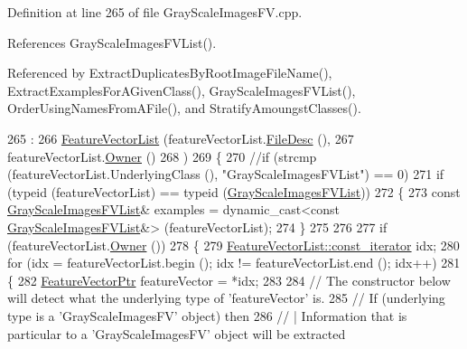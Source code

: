 Definition at line 265 of file Gray\+Scale\+Images\+F\+V.\+cpp.



References Gray\+Scale\+Images\+F\+V\+List().



Referenced by Extract\+Duplicates\+By\+Root\+Image\+File\+Name(), Extract\+Examples\+For\+A\+Given\+Class(), Gray\+Scale\+Images\+F\+V\+List(), Order\+Using\+Names\+From\+A\+File(), and Stratify\+Amoungst\+Classes().


\begin{DoxyCode}
265                                                                                         :
266   \hyperlink{class_k_k_m_l_l_1_1_feature_vector_list_a102284896708eb82b5879dcf9a92e974}{FeatureVectorList} (featureVectorList.\hyperlink{class_k_k_m_l_l_1_1_feature_vector_list_a736923be9c4ac7553a5aa87dd24efd16}{FileDesc} (),
267                      featureVectorList.\hyperlink{class_k_k_b_1_1_k_k_queue_a4990d037ff09dd504cc7df53819bf61a}{Owner} ()
268                     )
269 \{
270   \textcolor{comment}{//if  (strcmp (featureVectorList.UnderlyingClass (), "GrayScaleImagesFVList") == 0)}
271   \textcolor{keywordflow}{if}  (\textcolor{keyword}{typeid} (featureVectorList) == \textcolor{keyword}{typeid} (\hyperlink{class_k_k_m_l_l_1_1_gray_scale_images_f_v_list_aabed2fbe6de7f052cc63dc941a863372}{GrayScaleImagesFVList}))
272   \{
273     \textcolor{keyword}{const} \hyperlink{class_k_k_m_l_l_1_1_gray_scale_images_f_v_list}{GrayScaleImagesFVList}&  examples = \textcolor{keyword}{dynamic\_cast<}\textcolor{keyword}{const }
      \hyperlink{class_k_k_m_l_l_1_1_gray_scale_images_f_v_list}{GrayScaleImagesFVList}&\textcolor{keyword}{>} (featureVectorList);
274   \}
275 
276 
277   \textcolor{keywordflow}{if}  (featureVectorList.\hyperlink{class_k_k_b_1_1_k_k_queue_a4990d037ff09dd504cc7df53819bf61a}{Owner} ())
278   \{
279     \hyperlink{class_k_k_b_1_1_k_k_queue_aeb057c9c010446f46f57c1e355f981f1}{FeatureVectorList::const\_iterator}  idx;
280     \textcolor{keywordflow}{for}  (idx = featureVectorList.begin ();  idx != featureVectorList.end ();  idx++)
281     \{
282       \hyperlink{class_k_k_m_l_l_1_1_feature_vector}{FeatureVectorPtr} featureVector = *idx;
283       
284       \textcolor{comment}{// The constructor below will detect what the underlying type of 'featureVector' is.  }
285       \textcolor{comment}{// If (underlying type is a 'GrayScaleImagesFV' object)  then}
286       \textcolor{comment}{//   | Information that is particular to a 'GrayScaleImagesFV' object will be extracted}

\end{DoxyCode}
